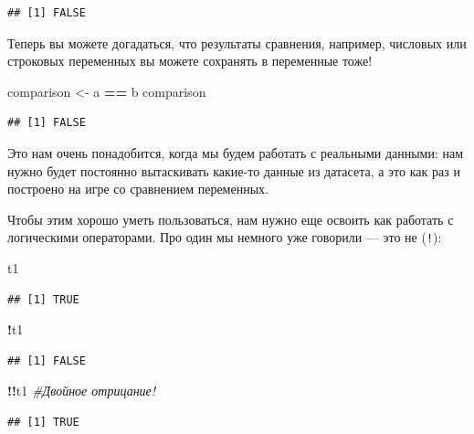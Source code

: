 \documentclass[]{book}
\newenvironment{Shaded}{\begin{snugshade}}{\end{snugshade}}
\newcommand{\StringTok}[1]{\textcolor[rgb]{0.31,0.60,0.02}{#1}}
\newcommand{\CommentTok}[1]{\textcolor[rgb]{0.56,0.35,0.01}{\textit{#1}}}
\newcommand{\OperatorTok}[1]{\textcolor[rgb]{0.81,0.36,0.00}{\textbf{#1}}}
\newcommand{\NormalTok}[1]{#1}
\begin{document}
\begin{verbatim}
## [1] FALSE
\end{verbatim}

Теперь вы можете догадаться, что результаты сравнения, например,
числовых или строковых переменных вы можете сохранять в переменные тоже!

\begin{Shaded}
\begin{Highlighting}[]
\NormalTok{comparison <-}\StringTok{ }\NormalTok{a }\OperatorTok{==}\StringTok{ }\NormalTok{b}
\NormalTok{comparison}
\end{Highlighting}
\end{Shaded}

\begin{verbatim}
## [1] FALSE
\end{verbatim}

Это нам очень понадобится, когда мы будем работать с реальными данными:
нам нужно будет постоянно вытаскивать какие-то данные из датасета, а это
как раз и построено на игре со сравнением переменных.

Чтобы этим хорошо уметь пользоваться, нам нужно еще освоить как работать
с логическими операторами. Про один мы немного уже говорили --- это не
(\texttt{!}):

\begin{Shaded}
\begin{Highlighting}[]
\NormalTok{t1}
\end{Highlighting}
\end{Shaded}

\begin{verbatim}
## [1] TRUE
\end{verbatim}

\begin{Shaded}
\begin{Highlighting}[]
\OperatorTok{!}\NormalTok{t1}
\end{Highlighting}
\end{Shaded}

\begin{verbatim}
## [1] FALSE
\end{verbatim}

\begin{Shaded}
\begin{Highlighting}[]
\OperatorTok{!!}\NormalTok{t1 }\CommentTok{#Двойное отрицание!}
\end{Highlighting}
\end{Shaded}

\begin{verbatim}
## [1] TRUE
\end{verbatim}
\end{document}
